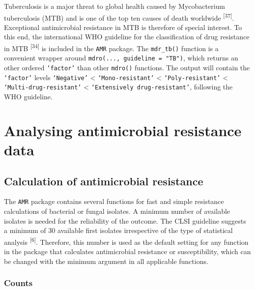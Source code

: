 \documentclass[
]{book}
\begin{document}
Tuberculosis is a major threat to global health caused by Mycobacterium tuberculosis (MTB) and is one of the top ten causes of death worldwide \textsuperscript{{[}37{]}}. Exceptional antimicrobial resistance in MTB is therefore of special interest. To this end, the international WHO guideline for the classification of drug resistance in MTB \textsuperscript{{[}34{]}} is included in the \texttt{AMR} package. The \texttt{mdr\_tb()} function is a convenient wrapper around \texttt{mdro(...,\ guideline\ =\ "TB")}, which returns an other ordered \texttt{‘factor’} than other \texttt{mdro()} functions. The output will contain the \texttt{‘factor’} levels \texttt{‘Negative’} \textless{} \texttt{‘Mono-resistant’} \textless{} \texttt{‘Poly-resistant’} \textless{} \texttt{‘Multi-drug-resistant’} \textless{} \texttt{‘Extensively\ drug-resistant’}, following the WHO guideline.

\hypertarget{analysing-antimicrobial-resistance-data}{%
\section{Analysing antimicrobial resistance data}\label{analysing-antimicrobial-resistance-data}}

\hypertarget{calculation-of-antimicrobial-resistance}{%
\subsection{Calculation of antimicrobial resistance}\label{calculation-of-antimicrobial-resistance}}

The \texttt{AMR} package contains several functions for fast and simple resistance calculations of bacterial or fungal isolates. A minimum number of available isolates is needed for the reliability of the outcome. The CLSI guideline suggests a minimum of 30 available first isolates irrespective of the type of statistical analysis \textsuperscript{{[}6{]}}. Therefore, this number is used as the default setting for any function in the package that calculates antimicrobial resistance or susceptibility, which can be changed with the minimum argument in all applicable functions.

\hypertarget{counts}{%
\subsubsection{Counts}\label{counts}}
\end{document}
